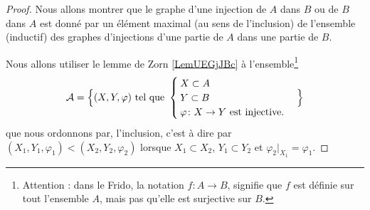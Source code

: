 \begin{proof}
    Nous allons montrer que le graphe d'une injection de $A$ dans $B$ ou de $B$ dans $A$ est donné par un élément maximal (au sens de l'inclusion) de l'ensemble (inductif) des graphes d'injections d'une partie de $A$ dans une partie de $B$.

    Nous allons utiliser le lemme de Zorn \ref{LemUEGjJBc} à l'ensemble\footnote{Attention : dans le Frido, la notation \( f\colon A\to B\), signifie que \( f\) est définie sur tout l'ensemble \( A\), mais pas qu'elle est surjective sur \( B\).}
    \begin{equation}
       \mathcal{A}=\Big\{  (X,Y,\varphi)  \text{ tel que }
        \begin{cases}
            X\subset A\\
            Y\subset B\\
            \varphi\colon X\to Y\text{ est injective.}
        \end{cases}
    \Big\}
    \end{equation}
    que nous ordonnons par, l'inclusion, c'est à dire par \( (X_1,Y_1,\varphi_1)<(X_2,Y_2,\varphi_2)\) lorsque \( X_1\subset X_2\), \( Y_{1}\subset Y_2\) et \( \varphi_2|_{X_1}=\varphi_1\).


\end{proof}
